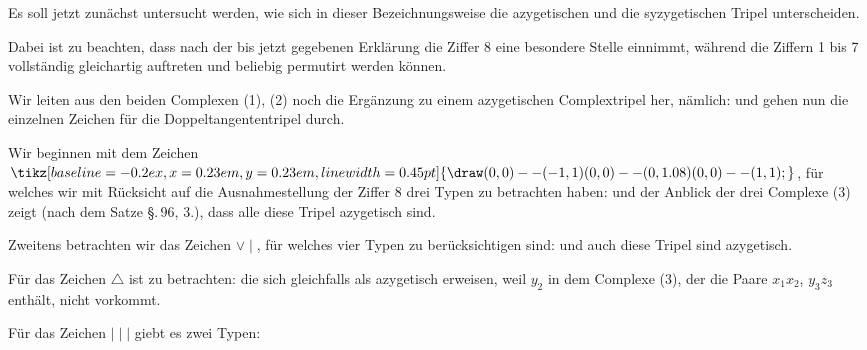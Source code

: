 \providecommand{\weberthreeup}{\mathord{\tikz[baseline=-0.2ex,x=0.23em,y=0.23em,line width=0.45pt]{\draw (0,0)--(-1,1) (0,0)--(0,1.08) (0,0)--(1,1);}}}
Es soll jetzt zunächst untersucht werden, wie sich in dieser
Bezeichnungsweise die azygetischen und die syzygetischen Tripel
unterscheiden.

Dabei ist zu beachten, dass nach der bis jetzt gegebenen
Erklärung die Ziffer 8 eine besondere Stelle einnimmt, während
die Ziffern 1 bis 7 vollständig gleichartig auftreten und beliebig
permutirt werden können.

Wir leiten aus den beiden Complexen (1), (2) noch die Ergänzung
 zu einem azygetischen Complextripel her, nämlich:
und gehen nun die einzelnen Zeichen für die Doppeltangententripel
 durch.

Wir beginnen mit dem Zeichen $\weberthreeup$, für welches wir mit
Rücksicht auf die Ausnahmestellung der Ziffer 8 drei Typen zu
betrachten haben:
und der Anblick der drei Complexe (3) zeigt (nach dem Satze
\S.\,96, 3.), dass alle diese Tripel azygetisch sind.

Zweitens betrachten wir das Zeichen $\vee\mid$, für welches vier
Typen zu berücksichtigen sind:
und auch diese Tripel sind azygetisch.

Für das Zeichen $\triangle$ ist zu betrachten:
die sich gleichfalls als azygetisch erweisen, weil $y_2$ in dem Complexe
 (3), der die Paare $x_1 x_2$, $y_3 z_3$ enthält, nicht vorkommt.

Für das Zeichen $\mid\mid\mid$ giebt es zwei Typen:
